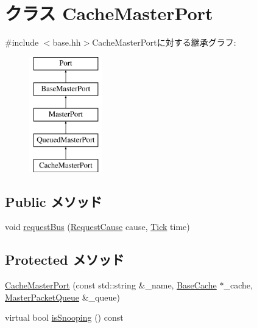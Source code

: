 \hypertarget{classBaseCache_1_1CacheMasterPort}{
\section{クラス CacheMasterPort}
\label{classBaseCache_1_1CacheMasterPort}
}


{\ttfamily \#include $<$base.hh$>$}CacheMasterPortに対する継承グラフ:\begin{figure}[H]
\begin{center}
\leavevmode
\includegraphics[height=5cm]{classBaseCache_1_1CacheMasterPort}
\end{center}
\end{figure}
\subsection*{Public メソッド}
\begin{DoxyCompactItemize}
\item 
void \hyperlink{classBaseCache_1_1CacheMasterPort_ab690fedcc60b65a21572adb94bce5525}{requestBus} (\hyperlink{classBaseCache_a8ca466a3028d5dd05a9f31798a0115b8}{RequestCause} cause, \hyperlink{base_2types_8hh_a5c8ed81b7d238c9083e1037ba6d61643}{Tick} time)
\end{DoxyCompactItemize}
\subsection*{Protected メソッド}
\begin{DoxyCompactItemize}
\item 
\hyperlink{classBaseCache_1_1CacheMasterPort_a566970d81040531eb8a0e5ea092e6683}{CacheMasterPort} (const std::string \&\_\-name, \hyperlink{classBaseCache_1_1BaseCache}{BaseCache} $\ast$\_\-cache, \hyperlink{classMasterPacketQueue}{MasterPacketQueue} \&\_\-queue)
\item 
virtual bool \hyperlink{classBaseCache_1_1CacheMasterPort_a32602a6a3c3d66a639455036d6c08dd6}{isSnooping} () const 
\end{DoxyCompactItemize}


